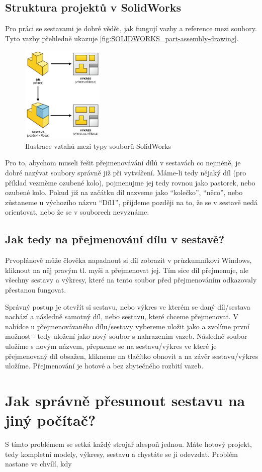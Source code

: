 \subsection*{Struktura projektů v SolidWorks}
Pro práci se sestavami je dobré vědět, jak fungují vazby a reference mezi soubory.
Tyto vazby přehledně ukazuje \autoref{fig:SOLIDWORKS_part-assembly-drawing}.
\begin{figure}[htpb]
    \centering
    \includegraphics[width=0.35\textwidth]{img/graphics/png/SOLIDWORKS - PART-ASSEMBLY-DRAWING.png}
    \caption{Ilustrace vztahů mezi typy souborů SolidWorks}
    \label{fig:SOLIDWORKS_part-assembly-drawing}
\end{figure}

Pro to, abychom museli řešit přejmenovávání dílů v sestavách co nejméně, je dobré nazývat soubory správně již při vytváření.
Máme-li tedy nějaký díl (pro příklad vezměme ozubené kolo), pojmenujme jej tedy rovnou jako pastorek, nebo ozubené kolo.
Pokud již na začátku díl nazveme jako \enquote{kolečko}, \enquote{něco}, nebo zůstaneme u výchozího názvu \enquote{Díl1}, přijdeme později na to, že se v sestavě nedá orientovat, nebo že se v souborech nevyznáme.

\subsection*{Jak tedy na přejmenování dílu v sestavě?}
Prvoplánově může člověka napadnout si díl zobrazit v průzkumníkovi Windows, kliknout na něj pravým tl. myši a přejmenovat jej. 
Tím sice díl přejmenuje, ale všechny sestavy a výkresy, které na tento soubor před přejmenováním odkazovaly přestanou fungovat.

Správný postup je otevřít si sestavu, nebo výkres ve kterém se daný díl/sestava nachází a následně samotný díl, nebo sestavu, které chceme přejmenovat.
V nabídce  u přejmenovávaného dílu/sestavy vybereme uložit jako a zvolíme první možnost - tedy uložení jako nový soubor s nahrazením vazeb.
Následně soubor uložíme s novým názvem, přepneme se na sestavu/výkres ve které je přejmenovaný díl obsažen, klikneme na tlačítko obnovit a na závěr sestavu/výkres uložíme.
Přejmenování je hotové a bez zbytečného rozbití vazeb.

\section{Jak správně přesunout sestavu na jiný počítač?}
S tímto problémem se setká každý strojař alespoň jednou.
Máte hotový projekt, tedy kompletní modely, výkresy, sestavu a chystáte se ji odevzdat.
Problém nastane ve chvílí, kdy 

